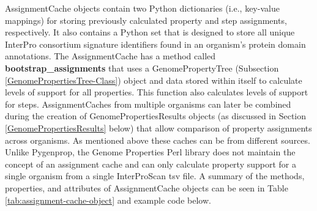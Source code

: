 AssignmentCache objects contain two Python dictionaries (i.e., key-value mappings) for storing previously calculated property and step assignments, respectively. It also contains a Python set that is designed to store all unique InterPro consortium signature identifiers found in an organism's protein domain annotations. The AssignmentCache has a method called \textbf{bootstrap\_assignments} that uses a GenomePropertyTree (Subsection \ref{GenomePropertiesTree-Class}) object and data stored within itself to calculate levels of support for all properties. This function also calculates levels of support for steps. AssignmentCaches from multiple organisms can later be combined during the creation of GenomePropertiesResults objects (as discussed in Section \ref{GenomePropertiesResults} below) that allow comparison of property assignments across organisms. As mentioned above these caches can be from different sources. Unlike Pygenprop, the Genome Properties Perl library does not maintain the concept of an assignment cache and can only calculate property support for a single organism from a single InterProScan \gls{tsv} file. A summary of the methods, properties, and attributes of AssignmentCache objects can be seen in Table \ref{tab:assignment-cache-object} and example code below.

